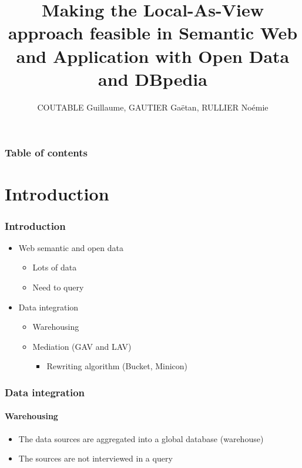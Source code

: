 \documentclass{beamer}
\title{Making the Local-As-View approach feasible in Semantic Web and Application with Open Data and DBpedia}
\author{COUTABLE Guillaume, GAUTIER Gaëtan, RULLIER Noémie}
\begin{document}
\begin{frame}
\titlepage
\end{frame}

\begin{frame}
\frametitle{Table of contents}
\tableofcontents
\end{frame}

\section{Introduction}
\begin{frame}
\frametitle{Introduction}
\begin{center}
\begin{itemize}
\item Web semantic and open data
\begin{itemize}
\item Lots of data
\item Need to query
\end{itemize}
\item Data integration
\begin{itemize}
\item Warehousing
\item Mediation (GAV and LAV)
\begin{itemize}
\item Rewriting algorithm (Bucket, Minicon)
\end{itemize}
\end{itemize}
\end{itemize}
\end{center}
\end{frame}

\begin{frame}
\frametitle{Data integration}
\framesubtitle{Warehousing}
\begin{center}
\begin{itemize}
\item The data sources are aggregated into a global database (warehouse)
\item The sources are not interviewed in a query
\end{itemize}
\end{center}
\end{frame}
\end{document}
